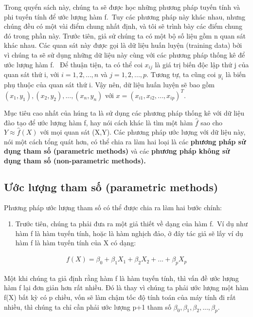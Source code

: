 \documentclass[
  12pt,
]{krantz}
\providecommand{\tightlist}{%
  \setlength{\itemsep}{0pt}\setlength{\parskip}{0pt}}
\begin{document}
Trong quyển sách này, chúng ta sẽ được học những phương pháp tuyến tính và phi tuyến tính để ước lượng hàm f.~Tuy các phương pháp này khác nhau, nhưng chúng đều có một vài điểm chung nhất định, và tôi sẽ trình bày các điểm chung đó trong phần này. Trước tiên, giả sử chúng ta có một bộ số liệu gồm n quan sát khác nhau. Các quan sát này được gọi là dữ liệu huấn luyện (training data) bởi vì chúng ta sẽ sử dụng những dữ liệu này cùng với các phương pháp thống kê để ước lượng hàm f.~
Để thuận tiện, ta có thể coi \(x_{ij}\) là giá trị biến độc lập thứ j của quan sát thứ i, với \(i = 1,2,...,n\) và \(j = 1,2,...,p\). Tương tự, ta cũng coi \(y_i\) là biến phụ thuộc của quan sát thứ i. Vậy nên, dữ liệu huấn luyện sẽ bao gồm \({(x_1, y_1), (x_2, y_2), ... ,(x_n, y_n)}\) với \(x = (x_{i1}, x_{i2}, ... , x_{ip})^T\).

Mục tiêu cao nhất của húng ta là sử dụng các phương pháp thống kê với dữ liệu đào tạo để ước lượng hàm f, hay nói cách khác là tìm một hàm \(\hat{f}\) sao cho \(Y \approx \hat{f}(X)\) với mọi quan sát (X,Y). Các phương pháp ước lượng với dữ liệu này, nói một cách tổng quát hơn, có thể chia ra làm hai loại là các \textbf{phương pháp sử dụng tham số (parametric methods)} và các \textbf{phương pháp không sử dụng tham số (non-parametric methods).}

\hypertarget{ux1b0ux1edbc-lux1b0ux1ee3ng-tham-sux1ed1-parametric-methods}{%
\subsection{Ước lượng tham số (parametric methods)}\label{ux1b0ux1edbc-lux1b0ux1ee3ng-tham-sux1ed1-parametric-methods}}

Phương pháp ước lượng tham số có thể được chia ra làm hai bước chính:

\begin{enumerate}
\def\labelenumi{\arabic{enumi}.}
\tightlist
\item
  Trước tiên, chúng ta phải đưa ra một giả thiết về dạng của hàm f.~Ví dụ như hàm f là hàm tuyến tính, hoặc là hàm nghịch đảo, ở đây tác giả sẽ lấy ví dụ hàm f là hàm tuyến tính của X có dạng:
\end{enumerate}

\begin{align}
f(X) = \beta_0 + \beta_1 X_1 + \beta_2 X_2 + ... + \beta_p X_p
\end{align}

Một khi chúng ta giả định rằng hàm f là hàm tuyến tính, thì vấn đề ước lượng hàm f lại đơn giản hơn rất nhiều. Đó là thay vì chúng ta phải ước lượng một hàm f(X) bất kỳ có p chiều, vốn sẽ làm chậm tốc độ tính toán của máy tính đi rất nhiều, thì chúng ta chỉ cần phải ước lượng p+1 tham số \(\beta_0, \beta_1, \beta_2, ... , \beta_p\).
\end{document}
